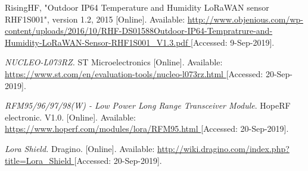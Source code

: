 \begin{thebibliography}{9}










RisingHF, "Outdoor IP64 Temperature and Humidity LoRaWAN sensor RHF1S001", version 1.2, 2015
[Online]. Available:
\url{
http://www.objenious.com/wp-content/uploads/2016/10/RHF-DS01588Outdoor-IP64-Tempratrure-and-Humidity-LoRaWAN-Sensor-RHF1S001_V1.3.pdf
}
[Accessed: 9-Sep-2019].




\textit{
NUCLEO-L073RZ.
}
ST Microelectronics
[Online]. Available:
\url{
https://www.st.com/en/evaluation-tools/nucleo-l073rz.html
}
[Accessed: 20-Sep-2019].



\textit{
RFM95/96/97/98(W) - Low Power Long Range Transceiver Module}.
HopeRF electronic.
V1.0.
[Online]. Available:
\url{
https://www.hoperf.com/modules/lora/RFM95.html
}
[Accessed: 20-Sep-2019].



\textit{
Lora Shield.
}
Dragino.
[Online]. Available:
\url{
http://wiki.dragino.com/index.php?title=Lora_Shield
}
[Accessed: 20-Sep-2019].


\end{thebibliography}
